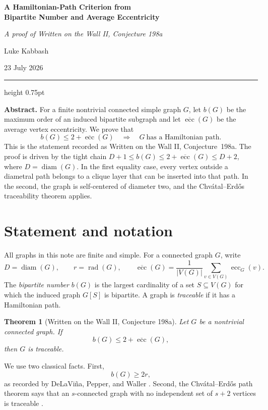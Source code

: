 \documentclass[10pt]{article}
\renewenvironment{abstract}
  {\begin{list}{}{%
     \setlength{\leftmargin}{0.22in}%
     \setlength{\rightmargin}{0.22in}%
   }\item\relax}
  {\end{list}}
\theoremstyle{paperplain}
\newtheorem{theorem}{Theorem}
\newcommand{\ecc}{\operatorname{ecc}}
\newcommand{\rad}{\operatorname{rad}}
\newcommand{\diam}{\operatorname{diam}}
\renewcommand{\maketitle}{%
  \thispagestyle{plain}
  \begin{center}
    \vspace*{6pt}
    {\bfseries\fontsize{23.5}{26.5}\selectfont
      A Hamiltonian-Path Criterion from\\
      Bipartite Number and Average Eccentricity\par}
    \vspace{7pt}
    {\itshape\fontsize{11.2}{14.2}\selectfont\color{papermuted}
      A proof of Written on the Wall II, Conjecture 198a\par}
    \vspace{7pt}
    {\fontsize{10.2}{13}\selectfont
      Luke Kabbash\par}
    \vspace{1pt}
    {\fontsize{9.2}{12}\selectfont\color{papermuted}23 July 2026\par}
  \end{center}
  \vspace{10pt}
  {\color{paperink}\hrule height 0.75pt}
  \vspace{10pt}
}
\begin{document}
\maketitle

\begin{abstract}
\small
\noindent\textbf{Abstract.}\enspace
For a finite nontrivial connected simple graph \(G\), let \(b(G)\) be
the maximum order of an induced bipartite subgraph and let
\(\overline{\ecc}(G)\) be the average vertex eccentricity.  We prove
that
\[
        b(G)\leq 2+\overline{\ecc}(G)
        \quad\Longrightarrow\quad
        G\ \text{has a Hamiltonian path}.
\]
This is the statement recorded as Written on the Wall II,
Conjecture~198a.  The proof is driven by the tight chain
\(D+1\leq b(G)\leq 2+\overline{\ecc}(G)\leq D+2\), where
\(D=\diam(G)\).  In the first equality case, every vertex outside a
diametral path belongs to a clique layer that can be inserted into
that path.  In the second, the graph is self-centered of diameter two,
and the Chv\'atal--Erd\H{o}s traceability theorem applies.
\end{abstract}

\section{Statement and notation}

All graphs in this note are finite and simple.  For a connected graph
\(G\), write
\[
  D=\diam(G),\qquad
  r=\rad(G),\qquad
  \overline{\ecc}(G)
    =\frac{1}{|V(G)|}\sum_{v\in V(G)}\ecc_G(v).
\]
The \emph{bipartite number} \(b(G)\) is the largest cardinality of a
set \(S\subseteq V(G)\) for which the induced graph \(G[S]\) is
bipartite.  A graph is \emph{traceable} if it has a Hamiltonian path.

\vspace{1pt}
\noindent{\color{paperink}\rule{\linewidth}{0.75pt}}
\vspace{-2pt}

\begin{theorem}[Written on the Wall II, Conjecture 198a]
\label{thm:main}
Let \(G\) be a nontrivial connected graph.  If
\[
                   b(G)\leq 2+\overline{\ecc}(G),
\]
then \(G\) is traceable.
\end{theorem}

\vspace{-3pt}
\noindent{\color{paperink}\rule{\linewidth}{0.75pt}}
\vspace{2pt}

We use two classical facts.  First,
\begin{equation}
                         b(G)\geq 2r ,
\label{eq:radius-bipartite}
\end{equation}
as recorded by DeLaVi\~na, Pepper, and Waller
\cite[Theorem~2]{DeLaVinaPepperWaller2007}.  Second, the
Chv\'atal--Erd\H{o}s path theorem says that an \(s\)-connected graph
with no independent set of \(s+2\) vertices is traceable
\cite[Theorem~2]{ChvatalErdos1972}.
\end{document}
